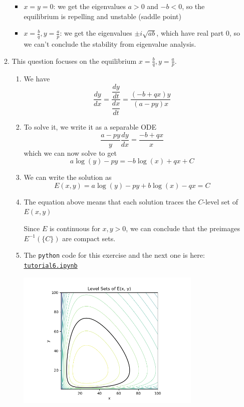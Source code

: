 \begin{enumerate}
\begin{enumerate}
	\begin{itemize}
		\item $x=y=0$: we get the eigenvalues $a>0$ and $-b<0$, so the equilibrium is repelling and unstable (saddle point)
		\item $x=\frac{b}{q}, y = \frac{a}{p}$: we get the eigenvalues $\pm i \sqrt{ab}$, which have real part 0, so we can't conclude the stability from eigenvalue analysis.
	\end{itemize}
	
	
	\item This question focuses on the equilibrium $x=\frac{b}{q}, y = \frac{a}{p}$.
	
	\begin{enumerate}
		\item We have
		\[
			\frac{dy}{dx} 
				= \frac{\dfrac{dy}{dt}}{\dfrac{dx}{dt}}
				= \frac{(-b + qx)y}{(a-py)x}
		\]
		
		\item To solve it, we write it as a separable ODE
		\[
			\frac{a-py}{y} \frac{dy}{dx} = \frac{-b+qx}{x}
		\]
		which we can now solve to get
		\[
		a\log(y) - py = -b\log(x) + qx + C
		\]
		
		\item We can write the solution as
		\[
		E(x,y) = a\log(y) - py +b\log(x) - qx = C
		\]
		
		\item The equation above means that each solution traces the $C$-level set of $E(x,y)$
		
		Since $E$ is continuous for $x,y>0$, we can conclude that the preimages $E^{-1}(\{C\})$ are compact sets.
		
		\item The \verb|python| code for this exercise and the next one is here: \href{https://utoronto.syzygy.ca/jupyter/user-redirect/git-pull?repo=https://github.com/bigfatbernie/IBLMathModeling&subPath=tutorials/tutorial6/tutorial6.ipynb}{\tt tutorial6.ipynb}
		\begin{center}
		\includegraphics[width=250pt]{LV-levelsets.png}	
		\end{center}


\end{enumerate}
\end{enumerate}
\end{enumerate}
